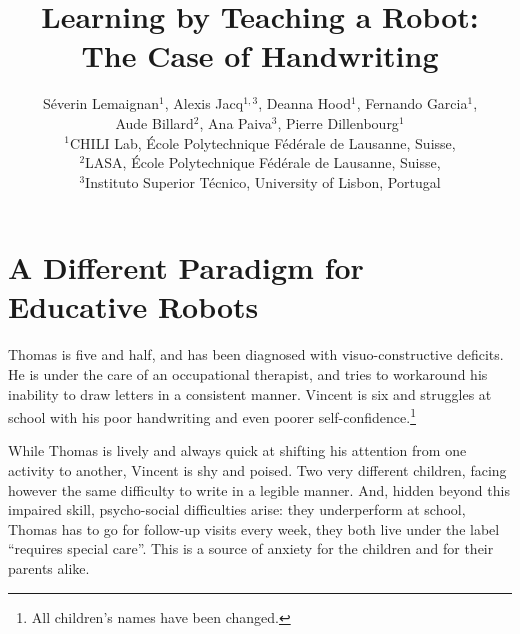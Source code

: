 \documentclass{article}
\title{Learning by Teaching a Robot:\\The Case of Handwriting}
\author{Séverin Lemaignan$^1$, Alexis Jacq$^{1,3}$, Deanna Hood$^1$, Fernando Garcia$^1$, \\
    Aude Billard$^2$, Ana Paiva$^3$, Pierre Dillenbourg$^1$ \\
$^1$CHILI Lab, École Polytechnique Fédérale de Lausanne, Suisse,\\
$^2$LASA, École Polytechnique Fédérale de Lausanne, Suisse,\\
$^3$Instituto Superior Técnico, University of Lisbon, Portugal}
\begin{document}
\maketitle

%
%


\section{A Different Paradigm for Educative Robots}

Thomas is five and half, and has been diagnosed with visuo-constructive
deficits. He is under the care of an occupational therapist, and tries to
workaround his inability to draw letters in a consistent manner. Vincent is six
and struggles at school with his poor handwriting and even poorer
self-confidence.\footnote{All children's names have been changed.}

While Thomas is lively and always quick at shifting his attention from one
activity to another, Vincent is shy and poised. Two very different children,
facing however the same difficulty to write in a legible manner. And, hidden
beyond this impaired skill, psycho-social difficulties arise: they underperform
at school, Thomas has to go for follow-up visits every week, they both live
under the label ``requires special care''. This is a source of anxiety for the
children and for their parents alike.
\end{document}
